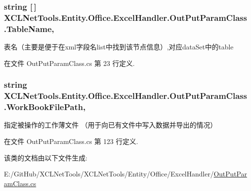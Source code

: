\subsubsection[{\texorpdfstring{Table\+Name}{TableName}}]{\setlength{\rightskip}{0pt plus 5cm}string \mbox{[}$\,$\mbox{]} X\+C\+L\+Net\+Tools.\+Entity.\+Office.\+Excel\+Handler.\+Out\+Put\+Param\+Class.\+Table\+Name\hspace{0.3cm}{\ttfamily [get]}, {\ttfamily [set]}}\hypertarget{class_x_c_l_net_tools_1_1_entity_1_1_office_1_1_excel_handler_1_1_out_put_param_class_a0a911a788ec6d71dd31abd3624400b67}{}\label{class_x_c_l_net_tools_1_1_entity_1_1_office_1_1_excel_handler_1_1_out_put_param_class_a0a911a788ec6d71dd31abd3624400b67}


表名（主要是便于在xml字段名list中找到该节点信息）,对应data\+Set中的table 



在文件 Out\+Put\+Param\+Class.\+cs 第 23 行定义.

\subsubsection[{\texorpdfstring{Work\+Book\+File\+Path}{WorkBookFilePath}}]{\setlength{\rightskip}{0pt plus 5cm}string X\+C\+L\+Net\+Tools.\+Entity.\+Office.\+Excel\+Handler.\+Out\+Put\+Param\+Class.\+Work\+Book\+File\+Path\hspace{0.3cm}{\ttfamily [get]}, {\ttfamily [set]}}\hypertarget{class_x_c_l_net_tools_1_1_entity_1_1_office_1_1_excel_handler_1_1_out_put_param_class_a5b29724ec341728c000b509ec1a5e5bc}{}\label{class_x_c_l_net_tools_1_1_entity_1_1_office_1_1_excel_handler_1_1_out_put_param_class_a5b29724ec341728c000b509ec1a5e5bc}


指定被操作的工作薄文件 （用于向已有文件中写入数据并导出的情况） 



在文件 Out\+Put\+Param\+Class.\+cs 第 123 行定义.



该类的文档由以下文件生成\+:\begin{DoxyCompactItemize}
\item 
E\+:/\+Git\+Hub/\+X\+C\+L\+Net\+Tools/\+X\+C\+L\+Net\+Tools/\+Entity/\+Office/\+Excel\+Handler/\hyperlink{_out_put_param_class_8cs}{Out\+Put\+Param\+Class.\+cs}\end{DoxyCompactItemize}
